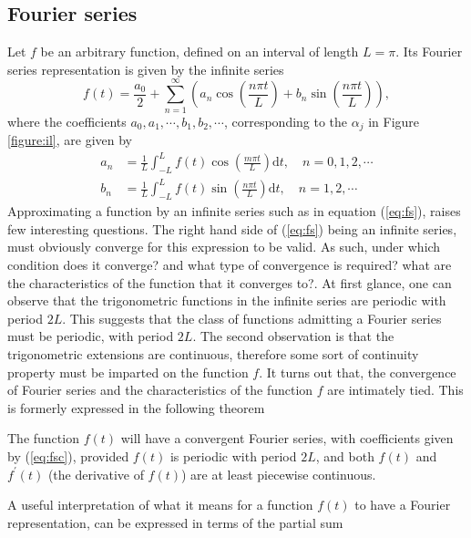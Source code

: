 \documentclass[../Main/thesis.tex]{subfiles}
\begin{document}
\subsection{Fourier series}
\label{sec:fouurier-serie}
 Let $f$ be an arbitrary function, defined on an interval of length $L = \pi$. Its Fourier series representation is given by the infinite series
\begin{equation}\label{eq:fs}
f(t) = \frac{a_{0}}{2} +\sum_{n=1}^{\infty}\left( a_{n} \cos\left( \frac{n\pi t}{L}\right) + b_{n} \sin\left( \frac{n\pi t}{L}\right)  \right),
 \end{equation}
where the coefficients $a_{0}, a_{1}, \cdots, b_{1}, b_{2},\cdots$, corresponding to the $\alpha_{j}$ in Figure \ref{figure:il}, are given by 
\begin{equation}\label{eq:fsc}
\begin{split}
a_{n} &= \frac{1}{L}\int_{-L}^{L}f(t)\cos\left( \frac{m\pi t}{L}\right) \mathrm{d}t,\quad n=0,1,2,\cdots\\
b_{n} &= \frac{1}{L}\int_{-L}^{L}f(t)\sin\left( \frac{n\pi t}{L}\right) \mathrm{d}t,\quad n=1,2,\cdots
\end{split}
\end{equation}
 Approximating a function by an infinite series such as in equation (\ref{eq:fs}), raises few interesting questions. The right hand side of (\ref{eq:fs}) being an infinite series, must obviously converge for this expression to be valid. As such, under which condition does it converge? and what type of convergence is required? what are the characteristics of the function that it converges to?.
\justify
At first glance, one can observe that the trigonometric functions in the infinite series are periodic with period $2L$. This suggests that the class of functions admitting a Fourier series must be periodic, with period $2L$. The second observation is that the trigonometric extensions are continuous, therefore some sort of continuity property must be imparted on the function $f$. It turns out that, the convergence of Fourier series and the characteristics of the function $f$ are intimately tied. This is formerly expressed in the following theorem
\begin{theorem}\label{thm:conv}
	The function $f(t)$ will  have a convergent Fourier series, with coefficients given by (\ref{eq:fsc}), provided $f(t)$ is periodic with period $2L$, and both $f(t)$ and $f^{\prime}(t)$ (the derivative of $f(t)$) are at least piecewise continuous.
\end{theorem}
\justify
A useful interpretation of what it means for a function $f(t)$ to have a Fourier representation, can be expressed in terms of the partial sum
\end{document}
